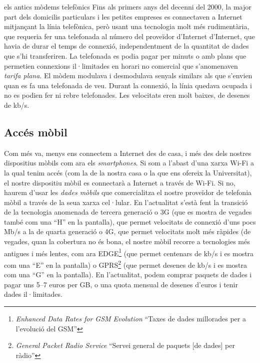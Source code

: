 \begin{persabermes}{els antics mòdems telefònics}
  Fins als primers anys del decenni del 2000, la major part dels
  domicilis particulars i les petites empreses es connectaven a
  Internet mitjançant la línia telefònica, però usant una tecnologia
  molt més rudimentària, que requeria fer una telefonada al número del
  proveïdor d'Internet d'Internet, que havia de durar el temps de
  connexió, independentment de la quantitat de dades que s'hi
  transferiren. La telefonada es podia pagar per minuts o amb plans
  que permetien connexions il·limitades en horari no comercial que
  s'anomenaven \emph{tarifa plana}. El mòdem modulava i desmodulava
  senyals similars als que s'envien quan es fa una telefonada de
  veu. Durant la connexió, la línia quedava ocupada i no es podien fer
  ni rebre telefonades. Les velocitats eren molt baixes, de desenes de
  kb/s.
\end{persabermes}


\subsection{Accés mòbil}
Com més va, menys ens connectem a Internet des de casa, i més des dels
nostres dispositius mòbils com ara els \emph{smartphones}. Si som a
l'abast d'una xarxa Wi-Fi a la qual tenim accés (com la de la nostra
casa o la que ens ofereix la Universitat), el nostre dispositiu mòbil
es connectarà a Internet a través de Wi-Fi. Si no, haurem d'usar les
\emph{dades mòbils} que comercialitza el nostre proveïdor de telefonia
mòbil a través de la seua xarxa cel·lular. En l'actualitat s'està fent
la transició de la tecnologia anomenada de tercera generació o 3G (que
es mostra de vegades també com una ``H'' en la pantalla), que permet
velocitats de connexió d'uns pocs Mb/s a la de quarta generació o 4G,
que permet velocitats molt més ràpides (de vegades, quan la cobertura
no és bona, el nostre mòbil recorre a tecnologies més antigues i més
lentes, com ara EDGE\footnote{\emph{Enhanced Data Rates for GSM
    Evolution} ``Taxes de dades millorades per a l'evolució del GSM''}
(que permet centenars de kb/s i es mostra com una ``E'' en la
pantalla) o GPRS\footnote{\emph{General Packet Radio Service} ``Servei
  general de paquets [de dades] per ràdio''} (que permet desenes de
kb/s i es mostra com una ``G'' en la pantalla). En l'actualitat, podem
comprar paquets de dades i pagar uns 5--7 euros per GB, o una quota mensual
de desenes d'euros i tenir dades il·limitades.


